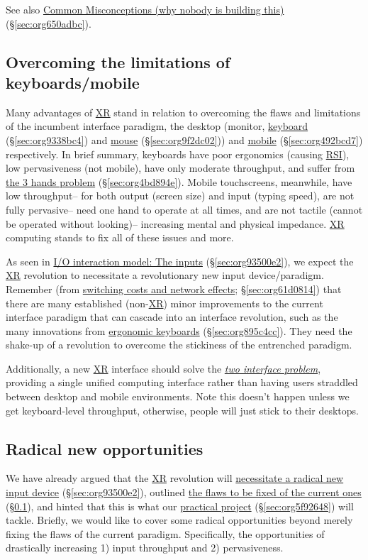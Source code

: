\documentclass[logo,bsc,singlespacing,parskip]{infthesis}
\begin{document}
See also \hyperref[sec:org650adbc]{Common Misconceptions (why nobody is building this)} (\S \ref{sec:org650adbc}).
\subsection{Overcoming the limitations of keyboards/mobile}
\label{sec:org85bf0b5}
Many advantages of \hyperref[org39cbd51]{XR} stand in relation to overcoming the flaws and limitations of the incumbent interface paradigm, the desktop (monitor, \hyperref[sec:org9338bc4]{keyboard} (\S \ref{sec:org9338bc4}) and \hyperref[sec:org9f2dc02]{mouse} (\S \ref{sec:org9f2dc02})) and \hyperref[sec:org492bcd7]{mobile} (\S \ref{sec:org492bcd7}) respectively.
In brief summary, keyboards have poor ergonomics (causing \hyperref[org77f0234]{RSI}), low pervasiveness (not mobile), have only moderate throughput, and suffer from \hyperref[sec:org4bd894e]{the 3 hands problem} (\S \ref{sec:org4bd894e}).
Mobile touchscreens, meanwhile, have low throughput-- for both output (screen size) and input (typing speed), are not fully pervasive-- need one hand to operate at all times, and are not tactile (cannot be operated without looking)-- increasing mental and physical impedance.
\hyperref[org39cbd51]{XR} computing stands to fix all of these issues and more.

As seen in \hyperref[sec:org93500e2]{I/O interaction model: The inputs} (\S \ref{sec:org93500e2}), we expect the \hyperref[org39cbd51]{XR} revolution to necessitate a revolutionary new input device/paradigm.
Remember (from \hyperref[sec:org61d0814]{switching costs and network effects}; \S \ref{sec:org61d0814}) that there are many established (non-\hyperref[org39cbd51]{XR}) minor improvements to the current interface paradigm that
can cascade into an interface revolution, such as the many innovations from \hyperref[sec:org895c4cc]{ergonomic keyboards} (\S \ref{sec:org895c4cc}).
They need the shake-up of a revolution to overcome the stickiness of the entrenched paradigm.

Additionally, a new \hyperref[org39cbd51]{XR} interface should solve the \emph{\hyperref[two interface problem]{two interface problem}}, providing a single unified computing interface rather than having users straddled between desktop and mobile environments.
Note this doesn't happen unless we get keyboard-level throughput, otherwise, people will just stick to their desktops.

\subsection{Radical new opportunities}
\label{sec:org23d9ecb}
We have already argued that the \hyperref[org39cbd51]{XR} revolution will \hyperref[sec:org93500e2]{necessitate a radical new input device} (\S \ref{sec:org93500e2}), outlined \hyperref[sec:org85bf0b5]{the flaws to be fixed of the current ones} (\S \ref{sec:org85bf0b5}), and hinted that this is what our \hyperref[sec:org5f92648]{practical project} (\S \ref{sec:org5f92648}) will tackle.
Briefly, we would like to cover some radical opportunities beyond merely fixing the flaws of the current paradigm.
Specifically, the opportunities of drastically increasing 1) input throughput and 2) pervasiveness.
\end{document}
